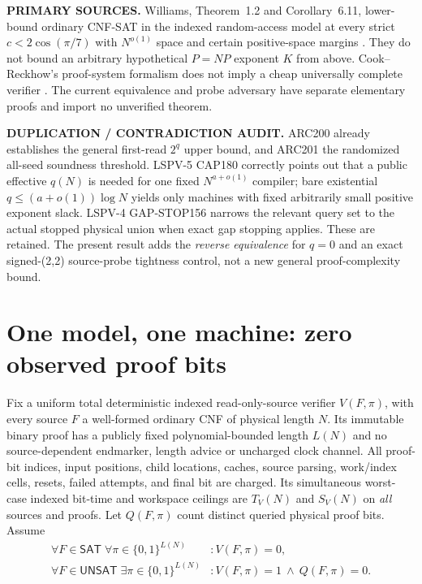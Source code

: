 \documentclass[11pt]{article}
\newcommand{\SAT}{\mathsf{SAT}}
\newcommand{\UNSAT}{\mathsf{UNSAT}}
\begin{document}
\noindent\textbf{PRIMARY SOURCES.} Williams, Theorem~1.2 and Corollary~6.11, lower-bound ordinary CNF-SAT in the indexed random-access model at every strict $c<2\cos(\pi/7)$ with $N^{o(1)}$ space and certain positive-space margins \cite{williams}. They do not bound an arbitrary hypothetical $P=NP$ exponent $K$ from above. Cook--Reckhow's proof-system formalism does not imply a cheap universally complete verifier \cite{cookreckhow}. The current equivalence and probe adversary have separate elementary proofs and import no unverified theorem.

\noindent\textbf{DUPLICATION / CONTRADICTION AUDIT.} ARC200 already establishes the general first-read $2^q$ upper bound, and ARC201 the randomized all-seed soundness threshold. LSPV-5 CAP180 correctly points out that a public effective $q(N)$ is needed for one fixed $N^{a+o(1)}$ compiler; bare existential $q\le(a+o(1))\log N$ yields only machines with fixed arbitrarily small positive exponent slack. LSPV-4 GAP-STOP156 narrows the relevant query set to the actual stopped physical union when exact gap stopping applies. These are retained. The present result adds the \emph{reverse equivalence} for $q=0$ and an exact signed-(2,2) source-probe tightness control, not a new general proof-complexity bound.

\section{One model, one machine: zero observed proof bits}
Fix a uniform total deterministic indexed read-only-source verifier $V(F,\pi)$, with every source $F$ a well-formed ordinary CNF of physical length $N$. Its immutable binary proof has a publicly fixed polynomial-bounded length $L(N)$ and no source-dependent endmarker, length advice or uncharged clock channel. All proof-bit indices, input positions, child locations, caches, source parsing, work/index cells, resets, failed attempts, and final bit are charged. Its simultaneous worst-case indexed bit-time and workspace ceilings are $T_V(N)$ and $S_V(N)$ on \emph{all} sources and proofs. Let $Q(F,\pi)$ count distinct queried physical proof bits. Assume
\begin{align}
 \forall F\in\SAT\;\forall\pi\in\{0,1\}^{L(N)} &: V(F,\pi)=0,\tag{1}\\
 \forall F\in\UNSAT\;\exists\pi\in\{0,1\}^{L(N)} &: V(F,\pi)=1\ \wedge\ Q(F,\pi)=0.\tag{2}
\end{align}
\end{document}

